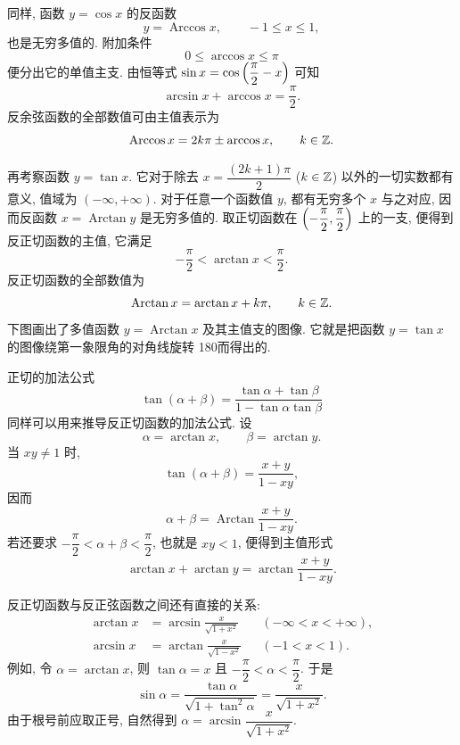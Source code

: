 同样, 函数 $y=\cos x$ 的反函数
$$
y=\operatorname{Arccos}x,\qquad -1\leqslant x\leqslant1,
$$
也是无穷多值的. 附加条件
$$
0\leqslant\arccos x\leqslant\pi
$$
便分出它的单值主支. 由恒等式
$\sin x=\cos\left( \dfrac{\pi}{2}-x \right)$ 可知
$$
\arcsin x+\arccos x=\frac{\pi}{2}.
$$
反余弦函数的全部数值可由主值表示为
$$
\operatorname{Arccos}x=2k\pi\pm\arccos x,\qquad k\in\mathbb{Z}.
$$

再考察函数 $y=\tan x$. 它对于除去
$x=\dfrac{(2k+1)\pi}{2}$ ($k\in\mathbb{Z}$) 以外的一切实数都有意义,
值域为 $(-\infty,+\infty)$. 对于任意一个函数值 $y$,
都有无穷多个 $x$ 与之对应, 因而反函数
$x=\operatorname{Arctan}y$ 是无穷多值的.
取正切函数在 $\left( -\dfrac{\pi}{2},\dfrac{\pi}{2} \right)$ 上的一支,
便得到反正切函数的主值, 它满足
$$
-\frac{\pi}{2}<\arctan x<\frac{\pi}{2}.
$$
反正切函数的全部数值为
$$
\operatorname{Arctan}x=\arctan x+k\pi,\qquad k\in\mathbb{Z}.
$$
下图画出了多值函数 $y=\operatorname{Arctan}x$ 及其主值支的图像.
它就是把函数 $y=\tan x$ 的图像绕第一象限角的对角线旋转 180\textdegree 而得出的.

\begin{figure}[!h]
    \vspace{-1cm}
    \centering
\end{figure}

正切的加法公式
$$
\tan(\alpha+\beta)
=\frac{\tan\alpha+\tan\beta}{1-\tan\alpha\tan\beta}
$$
同样可以用来推导反正切函数的加法公式. 设
$$
\alpha=\arctan x,\qquad\beta=\arctan y.
$$
当 $xy\ne1$ 时,
$$
\tan(\alpha+\beta)=\frac{x+y}{1-xy},
$$
因而
$$
\alpha+\beta
=\operatorname{Arctan}\frac{x+y}{1-xy}.
$$
若还要求 $-\dfrac{\pi}{2}<\alpha+\beta<\dfrac{\pi}{2}$,
也就是 $xy<1$, 便得到主值形式
$$
\arctan x+\arctan y
=\arctan\frac{x+y}{1-xy}.
$$

反正切函数与反正弦函数之间还有直接的关系:
$$
\begin{aligned}
\arctan x&=\arcsin\frac{x}{\sqrt{1+x^2}}
&&(-\infty<x<+\infty),\\
\arcsin x&=\arctan\frac{x}{\sqrt{1-x^2}}
&&(-1<x<1).
\end{aligned}
$$
例如, 令 $\alpha=\arctan x$, 则 $\tan\alpha=x$ 且
$-\dfrac{\pi}{2}<\alpha<\dfrac{\pi}{2}$. 于是
$$
\sin\alpha
=\frac{\tan\alpha}{\sqrt{1+\tan^2\alpha}}
=\frac{x}{\sqrt{1+x^2}}.
$$
由于根号前应取正号, 自然得到
$\alpha=\arcsin\dfrac{x}{\sqrt{1+x^2}}$.

